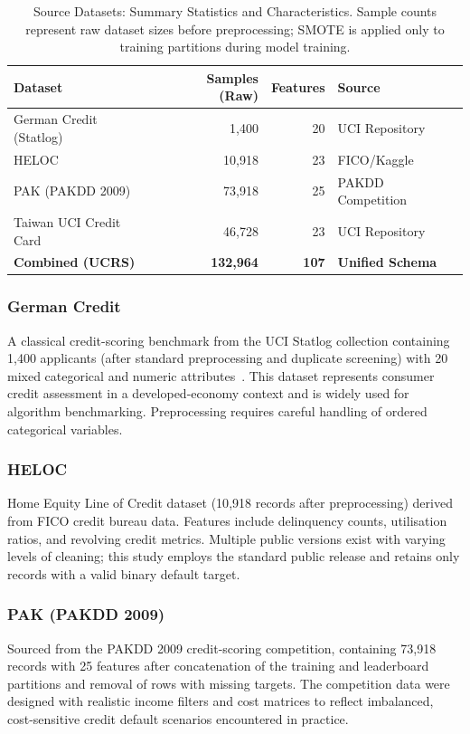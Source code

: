 \documentclass[onecolumn]{IEEEtai}
\begin{document}
\begin{table}[!htbp]
\centering
\small
\caption{Source Datasets: Summary Statistics and Characteristics. Sample counts represent raw dataset sizes before preprocessing; SMOTE is applied only to training partitions during model training.}
\label{tab:dataset_summary}
\begin{tabular}{lrrl}
\toprule
\textbf{Dataset} & \textbf{Samples (Raw)} & \textbf{Features} & \textbf{Source} \\
\midrule
German Credit (Statlog) & 1,400    & 20 & UCI Repository \\
HELOC                   & 10,918   & 23 & FICO/Kaggle \\
PAK (PAKDD 2009)        & 73,918   & 25 & PAKDD Competition \\
Taiwan UCI Credit Card  & 46,728   & 23 & UCI Repository \\
\midrule
\textbf{Combined (UCRS)} & \textbf{132,964} & \textbf{107} & \textbf{Unified Schema} \\
\bottomrule
\end{tabular}
\end{table}

\subsubsection{German Credit} A classical credit-scoring benchmark from the UCI Statlog collection containing 1{,}400 applicants (after standard preprocessing and duplicate screening) with 20 mixed categorical and numeric attributes~\cite{17,22}. This dataset represents consumer credit assessment in a developed-economy context and is widely used for algorithm benchmarking. Preprocessing requires careful handling of ordered categorical variables.

\subsubsection{HELOC} Home Equity Line of Credit dataset (10{,}918 records after preprocessing) derived from FICO credit bureau data. Features include delinquency counts, utilisation ratios, and revolving credit metrics. Multiple public versions exist with varying levels of cleaning; this study employs the standard public release and retains only records with a valid binary default target.

\subsubsection{PAK (PAKDD 2009)} Sourced from the PAKDD 2009 credit-scoring competition, containing 73{,}918 records with 25 features after concatenation of the training and leaderboard partitions and removal of rows with missing targets. The competition data were designed with realistic income filters and cost matrices to reflect imbalanced, cost-sensitive credit default scenarios encountered in practice.
\end{document}
